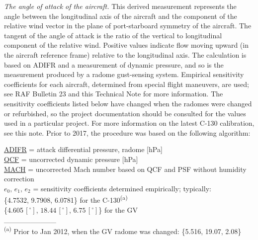 \documentclass[
]{book}
\begin{document}
\emph{The angle of attack of the aircraft.} This derived measurement represents the angle between the longitudinal axis of the aircraft and the component of the relative wind vector in the plane of port-starboard symmetry of the aircraft. The tangent of the angle of attack is the ratio of the vertical to longitudinal component of the relative wind. Positive values indicate flow moving upward (in the aircraft reference frame) relative to the longitudinal axis. The calculation is based on ADIFR and a measurement of dynamic pressure, and so is the measurement produced by a radome gust-sensing system. Empirical sensitivity coefficients for each aircraft, determined from special flight maneuvers, are used; see RAF Bulletin 23 and this Technical Note for more information. The sensitivity coefficients listed below have changed when the radomes were changed or refurbished, so the project documentation should be consulted for the values used in a particular project. For more information on the latest C-130 calibration, see this note.
Prior to 2017, the procedure was based on the following algorithm:

\protect\hyperlink{adifr}{ADIFR} = attack differential pressure, radome {[}hPa{]}\\
\protect\hyperlink{qcx}{QCF} = uncorrected dynamic pressure {[}hPa{]}\\
\protect\hyperlink{mach-number}{MACH} = uncorrected Mach number based on QCF and PSF
without humidity correction\\
\(e_{0},\,e{}_{1},\,e_{2}\) = sensitivity
coefficients determined empirically; typically:\\
\hspace*{0.333em}\hspace*{0.333em}\hspace*{0.333em}\hspace*{0.333em}\hspace*{0.333em}\{4.7532, 9.7908, 6.0781\} for the C-130\textsuperscript{(a)}\\
\hspace*{0.333em}\hspace*{0.333em}\hspace*{0.333em}\hspace*{0.333em}\hspace*{0.333em}\{4.605\(\,[^{\circ}]\), \(18.44\,[^{\circ}]\), \(6.75\,[^{\circ}]\)\}
for the GV\\
\_\_\_\_\_\_\_\_\_\_\\
\textsuperscript{(a)} Prior to Jan 2012, when the GV radome was changed: \{5.516, 19.07, 2.08\}
\end{document}
